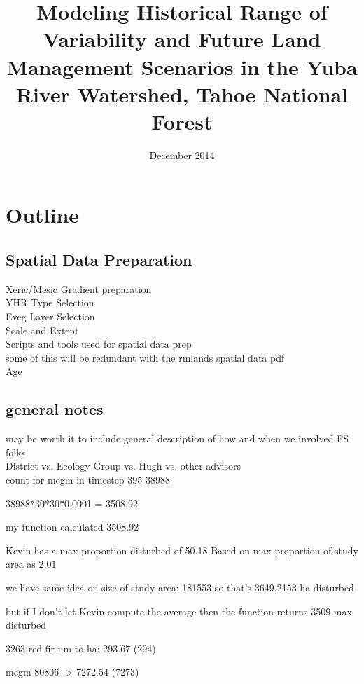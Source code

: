 \documentclass[12pt]{book}
\begin{document}
\title{Modeling Historical Range of Variability and Future Land Management Scenarios in the Yuba River Watershed, Tahoe National Forest}
\date{December 2014}

\section*{Outline}
\subsection*{Spatial Data Preparation}
Xeric/Mesic Gradient preparation\\
YHR Type Selection\\
Eveg Layer Selection\\
Scale and Extent\\
Scripts and tools used for spatial data prep\\
some of this will be redundant with the rmlands spatial data pdf\\
Age

\subsection*{general notes}
may be worth it to include general description of how and when we involved FS folks\\
District vs. Ecology Group vs. Hugh vs. other advisors\\

count for megm in timestep 395
38988 

38988*30*30*0.0001 = 3508.92

my function calculated 3508.92

Kevin has a max proportion disturbed of 50.18
Based on max proportion of study area as 2.01

we have same idea on size of study area: 181553
so that's 3649.2153 ha disturbed

but if I don't let Kevin compute the average then the function returns 3509 max disturbed

3263 red fir um
to ha: 293.67 (294)

megm
80806 -> 7272.54 (7273)

\tableofcontents 
% 

\mainmatter 

 
 
% 
 
%  

\backmatter 
% 
% 
\end{document}
